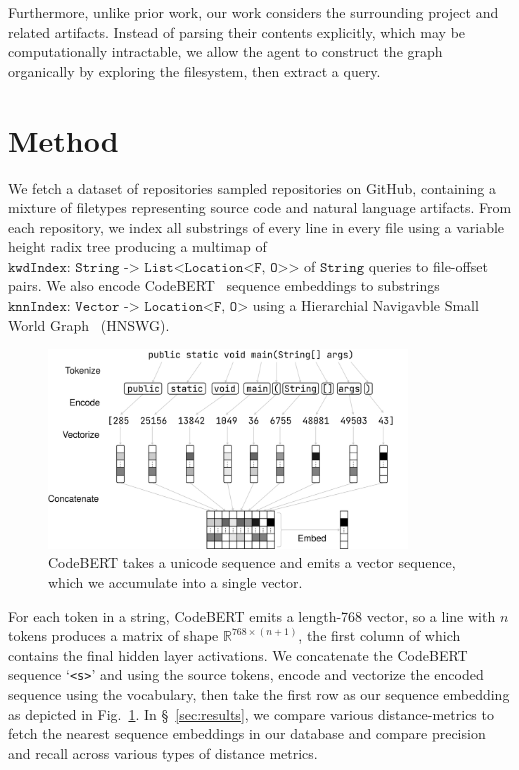 \documentclass[11pt]{article}
\begin{document}
Furthermore, unlike prior work, our work considers the surrounding project and related artifacts. Instead of parsing their contents explicitly, which may be computationally intractable, we allow the agent to construct the graph organically by exploring the filesystem, then extract a query.

\section{Method}

We fetch a dataset of repositories sampled repositories on GitHub, containing a mixture of filetypes representing source code and natural language artifacts. From each repository, we index all substrings of every line in every file using a variable height radix tree producing a multimap of $\texttt{kwdIndex: String -> List<Location<F, O>>}$ of $\texttt{String}$  queries to file-offset pairs. We also encode CodeBERT~\citep{feng2020codebert} sequence embeddings to substrings $\texttt{knnIndex: Vector -> Location<F, O>}$ using a Hierarchial Navigavble Small World Graph~\citep{malkov2018efficient} (HNSWG).


\begin{figure}[H]
  \centering
  \includegraphics[width=0.85\textwidth]{bert_embedding}
  \caption{CodeBERT takes a unicode sequence and emits a vector sequence, which we accumulate into a single vector.}
  \label{fig:bert}
\end{figure}

For each token in a string, CodeBERT emits a length-768 vector, so a line with $n$ tokens produces a matrix of shape $\mathbb R^{768 \times (n + 1)}$, the first column of which contains the final hidden layer activations. We concatenate the CodeBERT sequence `\texttt{<s>}' and using the source tokens, encode and vectorize the encoded sequence using the vocabulary, then take the first row as our sequence embedding as depicted in Fig.~\ref{fig:bert}. In \S~\ref{sec:results}, we compare various distance-metrics to fetch the nearest sequence embeddings in our database and compare precision and recall across various types of distance metrics.
\end{document}
